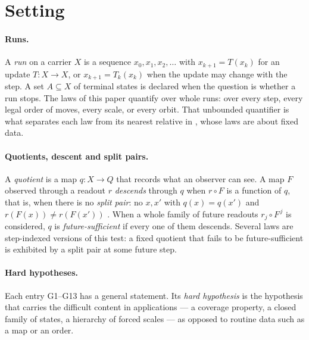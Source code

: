 \section{Setting}\label{sec:setting}

\paragraph{Runs.} A \emph{run} on a carrier $X$ is a sequence $x_0, x_1, x_2, \ldots$ with
$x_{k+1} = T(x_k)$ for an update $T : X \to X$, or $x_{k+1} = T_k(x_k)$ when the update may change
with the step. A set $A \subseteq X$ of terminal states is declared when the question is whether a
run stops. The laws of this paper quantify over whole runs: over every step, every legal order of
moves, every scale, or every orbit. That unbounded quantifier is what separates each law from its
nearest relative in \FoundIV{}, whose laws are about fixed data.

\paragraph{Quotients, descent and split pairs.} A \emph{quotient} is a map $q : X \to Q$ that
records what an observer can see. A map $F$ observed through a readout $r$ \emph{descends} through
$q$ when $r \circ F$ is a function of $q$, that is, when there is no \emph{split pair}: no $x, x'$
with $q(x) = q(x')$ and $r(F(x)) \ne r(F(x'))$ \citep{Tsiokos2026FoundIV}. When a whole family of
future readouts $r_j \circ F^{\,j}$ is considered, $q$ is \emph{future-sufficient} if every one of
them descends. Several laws are step-indexed versions of this test: a fixed quotient that fails to
be future-sufficient is exhibited by a split pair at some future step.

\paragraph{Hard hypotheses.} Each entry G1--G13 has a general statement. Its \emph{hard
hypothesis} is the hypothesis that carries the difficult content in applications --- a coverage
property, a closed family of states, a hierarchy of forced scales --- as opposed to routine data
such as a map or an order.

